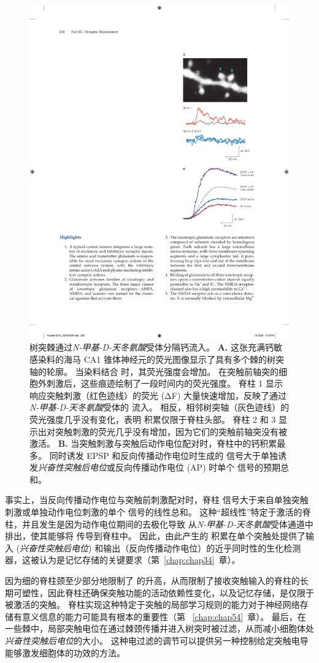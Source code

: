\begin{figure}[htbp]
	\centering
	\includegraphics[width=0.4\linewidth]{chap13/fig_13_18}
	\caption{树突棘通过\textit{N-甲基-D-天冬氨酸}受体分隔钙流入。
		\textbf{A.} 这张充满钙敏感染料的海马 CA1 锥体神经元的荧光图像显示了具有多个棘的树突轴的轮廓。
		当染料结合  时，其荧光强度会增加。
		在突触前轴突的细胞外刺激后，这些痕迹绘制了一段时间内的荧光强度。
		脊柱 1 显示响应突触刺激（红色迹线）的荧光 (ΔF) 大量快速增加，反映了通过\textit{N-甲基-D-天冬氨酸}受体的  流入。
		相反，相邻树突轴（灰色迹线）的荧光强度几乎没有变化，表明  积累仅限于脊柱头部。
		脊柱 2 和 3 显示出对突触刺激的荧光几乎没有增加，因为它们的突触前轴突没有被激活\cite{lang2004transient}。 
		\textbf{B.} 当突触刺激与突触后动作电位配对时，脊柱中的钙积累最多。
		同时诱发 EPSP 和反向传播动作电位时生成的  信号大于单独诱发\textit{兴奋性突触后电位}或反向传播动作电位 (AP) 时单个  信号的预期总和\cite{yuste1995dendritic}。}
	\label{fig:13_18}
\end{figure}


事实上，当反向传播动作电位与突触前刺激配对时，脊柱  信号大于来自单独突触刺激或单独动作电位刺激的单个  信号的线性总和。
这种“超线性”特定于激活的脊柱，并且发生是因为动作电位期间的去极化导致  从\textit{N-甲基-D-天冬氨酸}受体通道中排出，使其能够将  传导到脊柱中。
因此，由此产生的  积累在单个突触处提供了输入 (\textit{兴奋性突触后电位}) 和输出（反向传播动作电位）的近乎同时性的生化检测器，这被认为是记忆存储的关键要求（第~\ref{chap:chap34}~章）。


因为细的脊柱颈至少部分地限制了  的升高，从而限制了接收突触输入的脊柱的长期可塑性，因此脊柱还确保突触功能的活动依赖性变化，以及记忆存储，是仅限于被激活的突触。
脊柱实现这种特定于突触的局部学习规则的能力对于神经网络存储有意义信息的能力可能具有根本的重要性（第 ~\ref{chap:chap54}~章）。
最后，在一些棘中，局部突触电位在通过棘颈传播并进入树突时被过滤，从而减小细胞体处\textit{兴奋性突触后电位}的大小。
这种电过滤的调节可以提供另一种控制给定突触电导能够激发细胞体的功效的方法。



